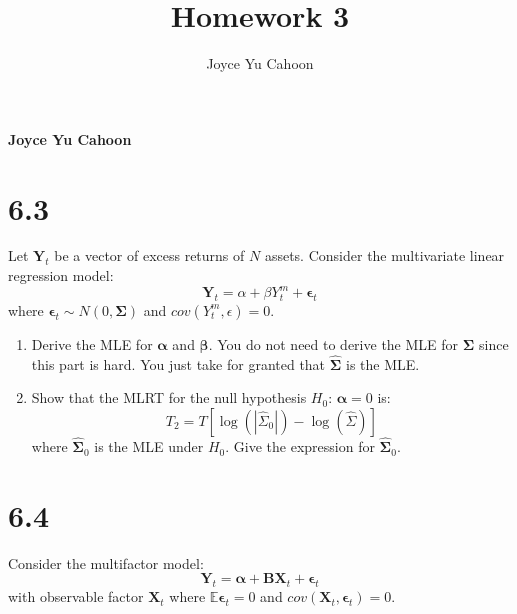 \documentclass[11pt,]{article}
\title{Homework 3  }
\author{\Large Joyce Yu Cahoon\vspace{0.05in} \newline\normalsize\emph{}  }
\date{}
\newcommand*{\authorfont}{\fontfamily{phv}\selectfont}
\newcommand{\V}[1]{{\bm{{#1}}}}
\providecommand{\tightlist}{%
\setlength{\itemsep}{0pt}\setlength{\parskip}{0pt}}
\begin{document}
%

{%
\setlength{\parindent}{0pt}
\thispagestyle{plain}
{\fontsize{18}{20}\selectfont\raggedright 
\maketitle  %

}

{
  \vskip 13.5pt\relax \normalsize\fontsize{11}{12} 
  \textbf{\authorfont Joyce Yu Cahoon} \hskip 15pt \emph{\small }   
  
}

}






\vskip 6.5pt


\noindent  \section{6.3}\label{section}

Let \(\V{Y}_t\) be a vector of excess returns of \(N\) assets. Consider
the multivariate linear regression model: \[
\V{Y}_t = \alpha + \beta Y_t^m + \V{\epsilon}_t
\] where \(\V{\epsilon}_t \sim N(0, \V{\Sigma})\) and
\(cov(Y_t^m, \epsilon) = 0\).

\begin{enumerate}
\def\labelenumi{\arabic{enumi}.}
\tightlist
\item
  Derive the MLE for \(\V{\alpha}\) and \(\V{\beta}\). You do not need
  to derive the MLE for \(\V{\Sigma}\) since this part is hard. You just
  take for granted that \(\V{\hat{\Sigma}}\) is the MLE.
\item
  Show that the MLRT for the null hypothesis \(H_0\): \(\V{\alpha} = 0\)
  is: \[
  T_2 = T[\log{(|\hat{\Sigma}_0|)} - \log{(\hat{\Sigma})}]
  \] where \(\V{\hat{\Sigma}}_0\) is the MLE under \(H_0\). Give the
  expression for \(\V{\hat{\Sigma}}_0\).
\end{enumerate}

\section{6.4}\label{section-1}

Consider the multifactor model: \[
\V{Y}_t = \V{\alpha} + \V{B}\V{X}_t + \V{\epsilon}_t
\] with observable factor \(\V{X}_t\) where
\(\mathbb{E}\V{\epsilon}_t =0\) and
\(cov(\V{X}_t, \V{\epsilon}_t) = 0\).
\end{document}
